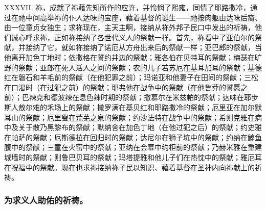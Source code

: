 XXXVII. 祢，成就了祢藉先知所作的应许，并怜悯了熙雍，同情了耶路撒冷，通过在祂中间高举祢的仆人达味的宝座，藉着基督的诞生——祂按肉躯由达味后裔、由一位童贞女独生；求祢现在，主天主啊，接纳从祢外邦子民口中发出的祈祷，他们诚心呼求祢，正如祢接纳了各世代义人的祭献一样。首先，祢看中了亚伯尔的祭献，并接纳了它，就如祢接纳了诺厄从方舟出来后的祭献一样；亚巴郎的祭献，当他离开加色丁地时；依撒格在誓约井边的祭献；雅各伯在贝特耳的祭献；梅瑟在旷野的祭献；亚郎在死人活人之间的祭献；农的儿子若苏厄在基耳加耳的祭献；基德红在磐石和羊毛前的祭献（在他犯罪之前）；玛诺亚和他妻子在田间的祭献；三松在口渴时（在过犯之前）的祭献；耶弗他在战争中的祭献（在他鲁莽的誓愿之前）；巴辣克和德波辣在息色辣时期的祭献；撒慕尔在米兹帕的祭献；达味在耶步斯人敖尔难的禾场上的祭献；撒罗满在基贝红和耶路撒冷的祭献；厄里亚在加尔默耳山的祭献；厄里叟在荒芜之泉的祭献；约沙法特在战争中的祭献；希则克雅在病中及关于散乃黑黎布的祭献；默纳舍在加色丁地（在他过犯之后）的祭献；约史雅在帕萨的祭献；厄斯德拉在回归时的祭献；达尼尔在狮子坑中的祭献；约纳在鲸鱼腹中的祭献；三童在火窑中的祭献；亚纳在会幕中约柜前的祭献；乃赫米雅在重建城墙时的祭献；则鲁巴贝耳的祭献；玛塔提雅和他儿子们在热忱中的祭献；雅厄耳在祝福中的祭献。现在也求祢接纳祢子民以知识、藉着基督在圣神内向祢献上的祈祷。\par


\subsubsection{为求义人助佑的祈祷。}

